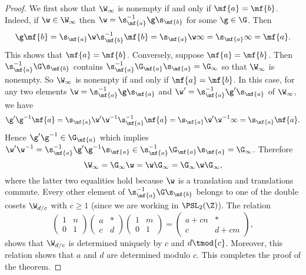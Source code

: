       \begin{proof}
        We first show that $\W_{\infty}$ is nonempty if and only if $\mf{a} = \mf{b}$. Indeed, if $\w \in \W_{\infty}$ then $\w = \s_{\mf{a}}^{-1}\g\s_{\mf{b}}$ for some $\g \in \G$. Then
        \[
          \g\mf{b} = \s_{\mf{a}}\w\s_{\mf{b}}^{-1}\mf{b} = \s_{\mf{a}}\w\infty = \s_{\mf{a}}\infty = \mf{a}.
        \]
        This shows that $\mf{a} = \mf{b}$. Conversely, suppose $\mf{a} = \mf{b}$. Then $\s_{\mf{a}}^{-1}\G\s_{\mf{b}}$ contains $\s_{\mf{a}}^{-1}\G_{\mf{a}}\s_{\mf{a}} = \G_{\infty}$ so that $\W_{\infty}$ is nonempty. So $\W_{\infty}$ is nonempty if and only if $\mf{a} = \mf{b}$. In this case, for any two elements $\w = \s_{\mf{a}}^{-1}\g\s_{\mf{a}}$ and $\w' = \s_{\mf{a}}^{-1}\g'\s_{\mf{a}}$ of $\W_{\infty}$, we have
        \[
          \g'\g^{-1}\mf{a} = \s_{\mf{a}}\w'\w^{-1}\s_{\mf{a}}^{-1}\mf{a} = \s_{\mf{a}}\w'\w^{-1}\infty = \s_{\mf{a}}\mf{a}.
        \]
        Hence $\g'\g^{-1} \in \G_{\mf{a}}$ which implies $\w'\w^{-1} = \s_{\mf{a}}^{-1}\g'\g^{-1}\s_{\mf{a}} \in \s_{\mf{a}}^{-1}\G_{\mf{a}}\s_{\mf{a}} = \G_{\infty}$. Therefore
        \[
          \W_{\infty} = \G_{\infty}\w = \w\G_{\infty} = \G_{\infty}\w\G_{\infty},
        \]
        where the latter two equalities hold because $\w$ is a translation and translations commute. Every other element of $\s_{\mf{a}}^{-1}\G\s_{\mf{b}}$ belongs to one of the double cosets $\W_{d/c}$ with $c \ge 1$ (since we are working in $\PSL_{2}(\Z)$). The relation
        \[
          \begin{pmatrix} 1 & n \\ 0 & 1 \end{pmatrix}\begin{pmatrix} a & \ast \\ c & d \end{pmatrix}\begin{pmatrix} 1 & m \\ 0 & 1 \end{pmatrix} = \begin{pmatrix} a+cn & \ast \\ c & d+cm \end{pmatrix},
        \]
        shows that $\W_{d/c}$ is determined uniquely by $c$ and $d \tmod{c}$. Moreover, this relation shows that $a$ and $d$ are determined modulo $c$. This completes the proof of the theorem.
      \end{proof}

